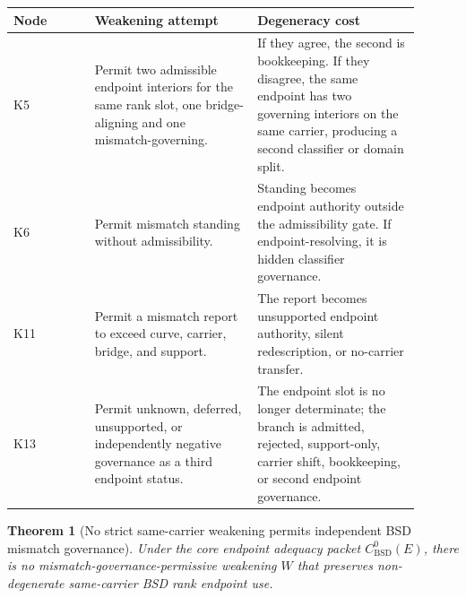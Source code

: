 \documentclass[11pt]{article}
\newtheorem{theorem}{Theorem}[section]
\newcommand{\BSD}{\mathrm{BSD}}
\begin{document}
\begin{longtable}{L{0.18\linewidth}L{0.36\linewidth}L{0.36\linewidth}}
\toprule
\textbf{Node} & \textbf{Weakening attempt} & \textbf{Degeneracy cost}\\
\midrule
K5 & Permit two admissible endpoint interiors for the same rank slot, one bridge-aligning and one mismatch-governing. & If they agree, the second is bookkeeping. If they disagree, the same endpoint has two governing interiors on the same carrier, producing a second classifier or domain split.\\
K6 & Permit mismatch standing without admissibility. & Standing becomes endpoint authority outside the admissibility gate. If endpoint-resolving, it is hidden classifier governance.\\
K11 & Permit a mismatch report to exceed curve, carrier, bridge, and support. & The report becomes unsupported endpoint authority, silent redescription, or no-carrier transfer.\\
K13 & Permit unknown, deferred, unsupported, or independently negative governance as a third endpoint status. & The endpoint slot is no longer determinate; the branch is admitted, rejected, support-only, carrier shift, bookkeeping, or second endpoint governance.\\
\bottomrule
\end{longtable}

\begin{theorem}[No strict same-carrier weakening permits independent BSD mismatch governance]\label{thm:no-strict-bsd-weakening}
Under the core endpoint adequacy packet $C^0_{\BSD}(E)$, there is no mismatch-governance-permissive weakening $W$ that preserves non-degenerate same-carrier BSD rank endpoint use.
\end{theorem}
\end{document}

